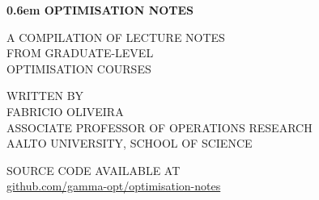 \newcommand\nbvspace[1][3]{\vspace*{\stretch{#1}}}

\newcommand\nbstretchyspace{\spaceskip0.5em plus 0.25em minus 0.25em}

\newcommand{\nbtitlestretch}{\spaceskip0.6em}

\thispagestyle{empty}

\begin{center}
	\bfseries
	\nbvspace[1]
	\Huge
	{\nbtitlestretch\huge
	OPTIMISATION NOTES}
	
	\nbvspace[1]
	\normalsize
	
	A COMPILATION OF LECTURE NOTES \\
	FROM GRADUATE-LEVEL \\
	OPTIMISATION COURSES 
	
	\nbvspace[1]
	\small WRITTEN BY\\
	\Large FABRICIO OLIVEIRA\\[0.5em]
	\footnotesize ASSOCIATE PROFESSOR OF OPERATIONS RESEARCH\\
	AALTO UNIVERSITY, SCHOOL OF SCIENCE
	
	\nbvspace[2]
	
	
	
	\normalsize
	
	SOURCE CODE AVAILABLE AT\\
	
	\large
	{\color{blue}\href{https://github.com/gamma-opt/optimisation-notes}{github.com/gamma-opt/optimisation-notes}}
	
	\nbvspace[1]
\end{center}




